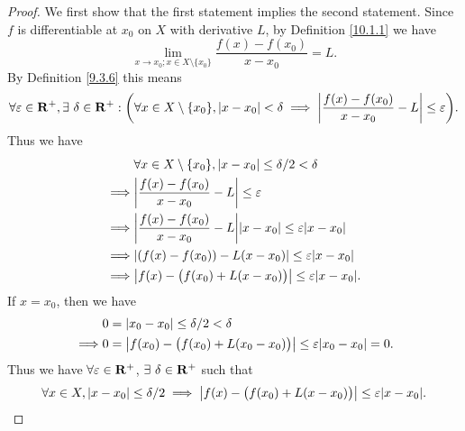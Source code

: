 \begin{proof}
    We first show that the first statement implies the second statement.
    Since \(f\) is differentiable at \(x_0\) on \(X\) with derivative \(L\), by Definition \ref{10.1.1} we have
    \[
        \lim_{x \to x_0 ; x \in X \setminus \{x_0\}} \frac{f(x) - f(x_0)}{x - x_0} = L.
    \]
    By Definition \ref{9.3.6} this means
    \[
        \forall \varepsilon \in \mathbf{R}^+, \exists\ \delta \in \mathbf{R}^+ : \bigg(\forall x \in X \setminus \{x_0\}, \left\lvert x - x_0\right\rvert < \delta \implies \left\lvert\frac{f(x) - f(x_0)}{x - x_0} - L\right\rvert \leq \varepsilon\bigg).
    \]
    Thus we have
    \begin{align*}
                 & \forall x \in X \setminus \{x_0\}, \abs{x - x_0} \leq \delta / 2 < \delta            \\
        \implies & \abs{\frac{f(x) - f(x_0)}{x - x_0} - L} \leq \varepsilon                             \\
        \implies & \abs{\frac{f(x) - f(x_0)}{x - x_0} - L} \abs{x - x_0} \leq \varepsilon \abs{x - x_0} \\
        \implies & \abs{(f(x) - f(x_0)) - L(x - x_0)} \leq \varepsilon \abs{x - x_0}                    \\
        \implies & \abs{f(x) - \big(f(x_0) + L(x - x_0)\big)} \leq \varepsilon \abs{x - x_0}.
    \end{align*}
    If \(x = x_0\), then we have
    \begin{align*}
                 & 0 = \abs{x_0 - x_0} \leq \delta / 2 < \delta                                             \\
        \implies & 0 = \abs{f(x_0) - \big(f(x_0) + L(x_0 - x_0)\big)} \leq \varepsilon \abs{x_0 - x_0} = 0.
    \end{align*}
    Thus we have \(\forall \varepsilon \in \mathbf{R}^+\), \(\exists\ \delta \in \mathbf{R}^+\) such that
    \[
        \forall x \in X, \abs{x - x_0} \leq \delta / 2 \implies \abs{f(x) - \big(f(x_0) + L(x - x_0)\big)} \leq \varepsilon \abs{x - x_0}.
    \]


\end{proof}

